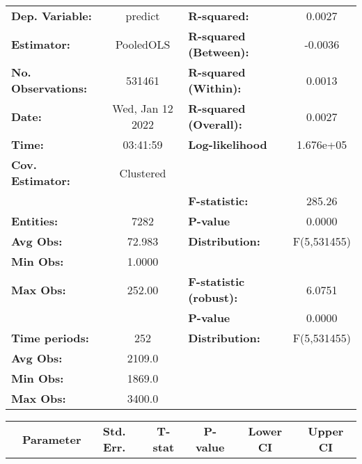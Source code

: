 \begin{center}
\begin{tabular}{lclc}
\toprule
\textbf{Dep. Variable:}    &      predict       & \textbf{  R-squared:         }   &      0.0027      \\
\textbf{Estimator:}        &     PooledOLS      & \textbf{  R-squared (Between):}  &     -0.0036      \\
\textbf{No. Observations:} &       531461       & \textbf{  R-squared (Within):}   &      0.0013      \\
\textbf{Date:}             &  Wed, Jan 12 2022  & \textbf{  R-squared (Overall):}  &      0.0027      \\
\textbf{Time:}             &      03:41:59      & \textbf{  Log-likelihood     }   &    1.676e+05     \\
\textbf{Cov. Estimator:}   &     Clustered      & \textbf{                     }   &                  \\
\textbf{}                  &                    & \textbf{  F-statistic:       }   &      285.26      \\
\textbf{Entities:}         &        7282        & \textbf{  P-value            }   &      0.0000      \\
\textbf{Avg Obs:}          &       72.983       & \textbf{  Distribution:      }   &   F(5,531455)    \\
\textbf{Min Obs:}          &       1.0000       & \textbf{                     }   &                  \\
\textbf{Max Obs:}          &       252.00       & \textbf{  F-statistic (robust):} &      6.0751      \\
\textbf{}                  &                    & \textbf{  P-value            }   &      0.0000      \\
\textbf{Time periods:}     &        252         & \textbf{  Distribution:      }   &   F(5,531455)    \\
\textbf{Avg Obs:}          &       2109.0       & \textbf{                     }   &                  \\
\textbf{Min Obs:}          &       1869.0       & \textbf{                     }   &                  \\
\textbf{Max Obs:}          &       3400.0       & \textbf{                     }   &                  \\
\bottomrule
\end{tabular}
\begin{tabular}{lcccccc}
                & \textbf{Parameter} & \textbf{Std. Err.} & \textbf{T-stat} & \textbf{P-value} & \textbf{Lower CI} & \textbf{Upper CI}  \\

\end{tabular}
\end{center}
